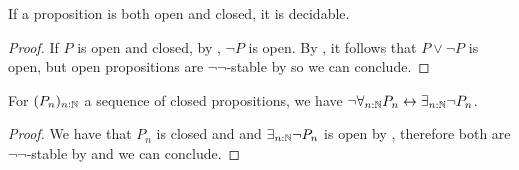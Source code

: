 \begin{corollary}\label{ClopenDecidable}
  If a proposition is both open and closed, it is decidable. 
\end{corollary}
\begin{proof}
  If $P$ is open and closed, by , $\neg P$ is open.
  By , it follows that $P\vee \neg P$ is open, but open propositions are $\neg\neg$-stable by  so we can conclude.
%  
\end{proof}



\begin{lemma}\label{ClosedMarkov}
  For $(P_n)_{n:\mathbb{N}}$ a sequence of closed propositions, we have 
  $\neg \forall_{n:\mathbb{N}} P_n \leftrightarrow  \exists_{n:\mathbb{N}} \neg P_n$. 
\end{lemma}
\begin{proof}
We have that $P_n$ is closed and and $\exists_{n:\mathbb{N}} \neg P_n$ is open by , therefore both are $\neg\neg$-stable by  and we can conclude.
\end{proof} 


